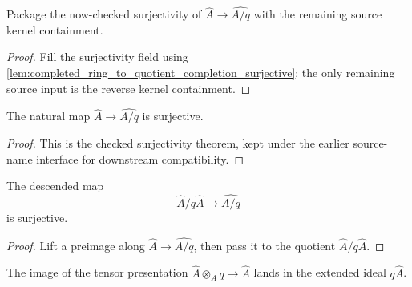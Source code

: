 \begin{lemma}
  \label{lem:completed_quotient_map_source_facts_source}
  Package the now-checked surjectivity of
  \(\widehat A\to\widehat{A/q}\) with the remaining source kernel
  containment.
\end{lemma}

\begin{proof}
  Fill the surjectivity field using
  \cref{lem:completed_ring_to_quotient_completion_surjective}; the only
  remaining source input is the reverse kernel containment.
\end{proof}

\begin{lemma}
  \label{lem:completed_ring_to_quotient_completion_surjective_source}
  The natural map \(\widehat A\to\widehat{A/q}\) is surjective.
\end{lemma}

\begin{proof}
  This is the checked surjectivity theorem, kept under the earlier source-name
  interface for downstream compatibility.
\end{proof}

\begin{lemma}
  \label{lem:completed_quotient_to_quotient_completion_surjective}
  The descended map
  \[
    \widehat A/q\widehat A\to\widehat{A/q}
  \]
  is surjective.
\end{lemma}

\begin{proof}
  Lift a preimage along \(\widehat A\to\widehat{A/q}\), then pass it to the
  quotient \(\widehat A/q\widehat A\).
\end{proof}

\begin{lemma}
  \label{lem:completed_ideal_tensor_image_le_completed_q}
  The image of the tensor presentation
  \(\widehat A\otimes_A q\to \widehat A\) lands in the extended ideal
  \(q\widehat A\).
\end{lemma}

